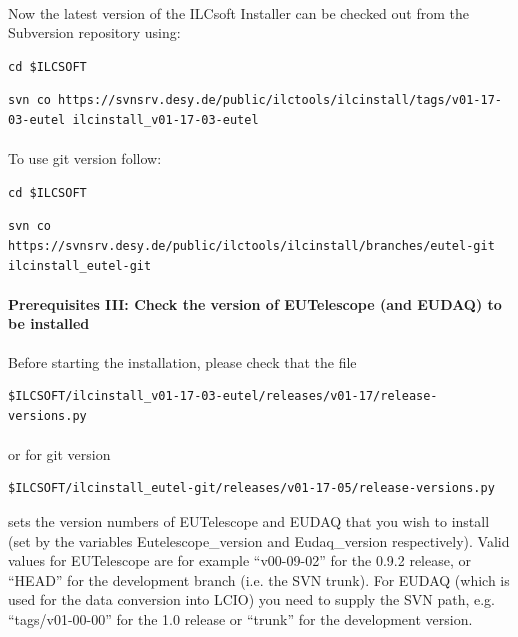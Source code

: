 \documentclass[11pt]{article}
\begin{document}
\paragraph{}
Now the latest version of the ILCsoft Installer can be checked out from the Subversion repository using:\\
\begin{verbatim}
cd $ILCSOFT
\end{verbatim}
\begin{verbatim}
svn co https://svnsrv.desy.de/public/ilctools/ilcinstall/tags/v01-17-03-eutel ilcinstall_v01-17-03-eutel
\end{verbatim}
\paragraph{}
To use git version follow:\\
\begin{verbatim}
cd $ILCSOFT
\end{verbatim}
\begin{verbatim}
svn co https://svnsrv.desy.de/public/ilctools/ilcinstall/branches/eutel-git ilcinstall_eutel-git
\end{verbatim}
\paragraph{Prerequisites III: Check the version of EUTelescope (and EUDAQ) to be installed}
Before starting the installation, please check that the file\\
\begin{verbatim}
$ILCSOFT/ilcinstall_v01-17-03-eutel/releases/v01-17/release-versions.py
\end{verbatim}
\paragraph{}
or for git version\\
\begin{verbatim}
$ILCSOFT/ilcinstall_eutel-git/releases/v01-17-05/release-versions.py
\end{verbatim}
sets the version numbers of EUTelescope and EUDAQ that you wish to install (set by the variables Eutelescope\_version and Eudaq\_version respectively). Valid values for EUTelescope are for example ``v00-09-02'' for the 0.9.2 release, or ``HEAD'' for the development branch (i.e. the SVN trunk). For EUDAQ (which is used for the data conversion into LCIO) you need to supply the SVN path, e.g. ``tags/v01-00-00'' for the 1.0 release or ``trunk'' for the development version.
\end{document}
